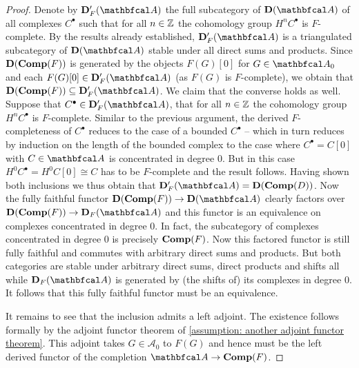 \begin{proof}
	Denote by $\categoryname{D}'_F(\category A)$ the full subcategory of $\derived{\category{A}}$ of all complexes $C^\bullet$ such that for all $n\in {\mathbb{Z}}$ the cohomology group $H^nC^\bullet$ is $F$-complete.	By the results already established, $\categoryname{D}'_F(\category A)$ is a triangulated subcategory of $\derived{\category A}$ stable under all direct sums and products. Since ${{\mathbf{D}}({{\mathbf{Comp}}(F)})}$ is generated by the objects $F(G)[0]$ for $G\in\category{A}_0$ and each $F(G)[0] \in \categoryname{D}'_F(\category A)$ (as $F(G)$ is $F$-complete), we obtain that $\derived{\completeMod{F}}\subseteq \categoryname{D}'_F(\category A)$. We claim that the converse holds as well. Suppose that $C^\bullet \in \categoryname{D}'_F(\category A)$, \ie that for all $n\in {\mathbb{Z}}$ the cohomology group $H^nC^\bullet$ is $F$-complete. Similar to the previous argument, the derived $F$-completeness of $C^\bullet$ reduces to the case of a bounded $C^\bullet$ -- which in turn reduces by induction on the length of the bounded complex to the case where $C^\bullet = C[0]$ with $C\in\category{A}$ is concentrated in degree $0$. But in this case $H^0C^\bullet = H^0 C[0] \cong C$ has to be $F$-complete and the result follows. Having shown both inclusions we thus obtain that $\categoryname{D}'_F(\category A) = \derived{\completeMod{D}}$. Now the fully faithful functor $\derived{\completeMod{F}} \to \derived{\category{A}}$ clearly factors over $\derived{\completeMod{F}}\to \categoryname{D}_F(\category A)$ and this functor is an equivalence on complexes concentrated in degree $0$. In fact, the subcategory of complexes concentrated in degree $0$ is precisely ${{\mathbf{Comp}}(F)}$. Now this factored functor is still fully faithful and commutes with arbitrary direct sums and products. But both categories are stable under arbitrary direct sums, direct products and shifts all while $\categoryname{D}_F(\category{A})$ is generated by (the shifts of) its complexes in degree $0$. It follows that this fully faithful functor must be an equivalence.
	
	It remains to see that the inclusion admits a left adjoint. The existence follows formally by the adjoint functor theorem of \assumptionPreWord \ref{assumption: another adjoint functor theorem}. This adjoint takes $G\in\mathcal{A}_0$ to $F(G)$ and hence must be the left derived functor of the completion $\category{A} \to \completeMod{F}$.
\end{proof}

